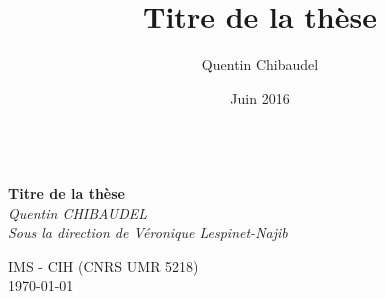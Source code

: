 \documentclass[a4paper,12pt]{report}
\title{Titre de la thèse}
\author{Quentin Chibaudel}
\date{Juin 2016}
\begin{document}
\begin{titlepage}
    \begin{center}

    \huge{\textbf{}}\\
    \vspace{0.5cm}
    \textbf{Titre de la thèse}\\
    \vspace{1cm}
    \textit{\large{
    Quentin CHIBAUDEL\\
    Sous la direction de Véronique Lespinet-Najib}}
    \vspace{1.5cm}
    
    \vfill
    \normalsize{IMS - CIH (CNRS UMR 5218)}\\
    \normalsize{\today}\\
    \end{center}

\end{titlepage}

\newpage

\newpage

\newpage

\newpage{}

\newpage 

\end{document}
